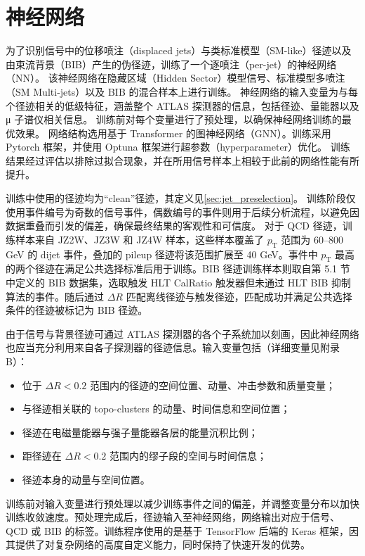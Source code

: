 
\chapter{神经网络}
\label{chap:NN}

为了识别信号中的位移喷注（displaced jets）与类标准模型（SM-like）径迹以及由束流背景（BIB）产生的伪径迹，训练了一个逐喷注（per-jet）的神经网络（NN）。
该神经网络在隐藏区域（Hidden Sector）模型信号、标准模型多喷注（SM Multi-jets）以及 BIB 的混合样本上进行训练。
神经网络的输入变量为与每个径迹相关的低级特征，涵盖整个 ATLAS 探测器的信息，包括径迹、量能器以及 μ 子谱仪相关信息。
训练前对每个变量进行了预处理，以确保神经网络训练的最优效果。
网络结构选用基于 Transformer 的图神经网络（GNN）。训练采用 Pytorch 框架，并使用 Optuna 框架进行超参数（hyperparameter）优化。
训练结果经过评估以排除过拟合现象，并在所用信号样本上相较于此前的网络性能有所提升。

训练中使用的径迹均为“clean”径迹，其定义见\autoref{sec:jet_preselection}。
训练阶段仅使用事件编号为奇数的信号事件，偶数编号的事件则用于后续分析流程，以避免因数据重叠而引发的偏差，确保最终结果的客观性和可信度。
对于 QCD 径迹，训练样本来自 JZ2W、JZ3W 和 JZ4W 样本，这些样本覆盖了 $p_{\mathrm{T}}$ 范围为 60--800 GeV 的 dijet 事件，叠加的 pileup 径迹将该范围扩展至 40 GeV。事件中 $p_{\mathrm{T}}$ 最高的两个径迹在满足公共选择标准后用于训练。BIB 径迹训练样本则取自第 5.1 节中定义的 BIB 数据集，选取触发 HLT CalRatio 触发器但未通过 HLT BIB 抑制算法的事件。随后通过 $\Delta R$ 匹配离线径迹与触发径迹，匹配成功并满足公共选择条件的径迹被标记为 BIB 径迹。

由于信号与背景径迹可通过 ATLAS 探测器的各个子系统加以刻画，因此神经网络也应当充分利用来自各子探测器的径迹信息。输入变量包括（详细变量见附录 B）：

\begin{itemize}
    \item 位于 $\Delta R < 0.2$ 范围内的径迹的空间位置、动量、冲击参数和质量变量；
    \item 与径迹相关联的 topo-clusters 的动量、时间信息和空间位置；
    \item 径迹在电磁量能器与强子量能器各层的能量沉积比例；
    \item 距径迹在 $\Delta R < 0.2$ 范围内的缪子段的空间与时间信息；
    \item 径迹本身的动量与空间位置。
\end{itemize}

训练前对输入变量进行预处理以减少训练事件之间的偏差，并调整变量分布以加快训练收敛速度。预处理完成后，径迹输入至神经网络，网络输出对应于信号、QCD 或 BIB 的标签。训练程序使用的是基于 TensorFlow 后端的 Keras 框架，因其提供了对复杂网络的高度自定义能力，同时保持了快速开发的优势。

